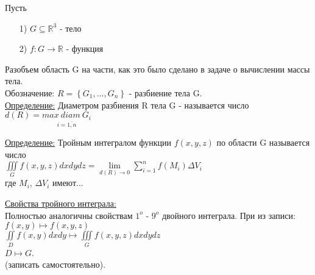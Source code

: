 Пусть \\
\begin{enumerate}
	\item[1)]
	$G \subseteq \mathbb{R}^3$ - тело 
	
	\item[2)]
	$f: G \rightarrow \mathbb{R}$ - функция
\end{enumerate}

Разобъем область G на части, как это было сделано в задаче о вычислении массы тела. \\

Обозначение: $R = \left\{G_1, ... , G_n\right\}$ - разбиение тела G. \\

\underline{Определение:} Диаметром разбиения R тела G - называется число $d(R) = \underset{i = \overline{1,n}}{max \ diam \ G_i}$

\underline{Определение:} Тройным интегралом функции $f(x,y,z)$  по области G называется число \\
$\iiint\limits_{G} f(x,y,z) dxdydz = 
\lim\limits_{d(R) \rightarrow 0} \sum\limits_{i = 1}^{n} f(M_i) \Delta V_i$ \\
где $M_i$, $\Delta V_i$ имеют...


\underline{Свойства тройного интеграла:} \\
Полностью аналогичны свойствам $1^o$ - $9^o$ двойного интеграла. При из записи: \\
$f(x,y) \mapsto f(x,y,z)$ \\
$\iint\limits_{D} f(x,y) dxdy \mapsto \iiint\limits_{G} f(x,y,z) dxdydz$ \\
$D \mapsto G$. \\
 
(записать самостоятельно).
